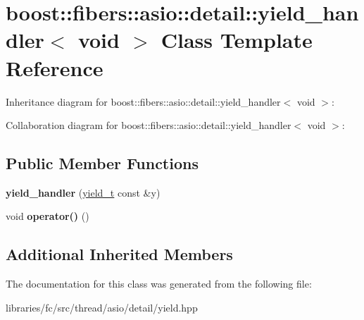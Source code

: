 \hypertarget{classboost_1_1fibers_1_1asio_1_1detail_1_1yield__handler_3_01void_01_4}{}\section{boost\+:\+:fibers\+:\+:asio\+:\+:detail\+:\+:yield\+\_\+handler$<$ void $>$ Class Template Reference}
\label{classboost_1_1fibers_1_1asio_1_1detail_1_1yield__handler_3_01void_01_4}


Inheritance diagram for boost\+:\+:fibers\+:\+:asio\+:\+:detail\+:\+:yield\+\_\+handler$<$ void $>$\+:


Collaboration diagram for boost\+:\+:fibers\+:\+:asio\+:\+:detail\+:\+:yield\+\_\+handler$<$ void $>$\+:
\subsection*{Public Member Functions}
\begin{DoxyCompactItemize}
\item 
\mbox{\label{classboost_1_1fibers_1_1asio_1_1detail_1_1yield__handler_3_01void_01_4_a5b27d39373eb91b4818bf7f351743eec}} 
{\bfseries yield\+\_\+handler} (\mbox{\hyperlink{classboost_1_1fibers_1_1asio_1_1yield__t}{yield\+\_\+t}} const \&y)
\item 
\mbox{\label{classboost_1_1fibers_1_1asio_1_1detail_1_1yield__handler_3_01void_01_4_a81d0504eab78c1802e74ba15ffa51330}} 
void {\bfseries operator()} ()
\end{DoxyCompactItemize}
\subsection*{Additional Inherited Members}


The documentation for this class was generated from the following file\+:\begin{DoxyCompactItemize}
\item 
libraries/fc/src/thread/asio/detail/yield.\+hpp\end{DoxyCompactItemize}
